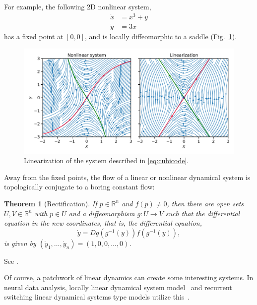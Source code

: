 \documentclass[a4paper,11pt]{exam}
\newtheorem{theorem}{Theorem}
\newcounter{ct}
\newcommand{\inv}{^{-1}}
\newcommand{\field}[1]{\ensuremath{\mathbb{#1}}}
\newcommand{\reals}{\field{R}}
\begin{document}
\begin{questions}
For example, the following 2D nonlinear system,
\begin{align}\label{eq:cubicode}
\dot x &= x^3 + y\\
\dot y &= 3x
\end{align}
has a fixed point at $[0, 0]$, and is locally diffeomorphic to a saddle (Fig.~\ref{fig:linearization}).
\begin{figure}[hbt]
    \centering
    \includegraphics[width=\textwidth]{linearization}
    \caption{Linearization of the system described in \eqref{eq:cubicode}.}
    \label{fig:linearization}
\end{figure}

Away from the fixed points, the flow of a linear or nonlinear dynamical system is topologically conjugate to a boring constant flow:
\begin{theorem}[Rectification]
    If $p \in \reals^n$ and $f(p) \neq 0$, then there are open sets $U, V \in \reals^n$ with $p \in U$ and a diffeomorphism $g: U \to V$ such that the differential equation in the new coordinates, that is, the differential equation,
    $$ \dot{y} = Dg(g\inv(y)) f(g\inv(y)), $$
is given by $(\dot{y}_1, \ldots, \dot{y}_n) = (1, 0, 0, \ldots, 0)$.
\end{theorem}
See \citet[Lemma 1.120]{Chicone2006}.

Of course, a patchwork of linear dynamics can create some interesting systems.
In neural data analysis, locally linear dynamical system model~\cite{Zhao2016d} and recurrent switching linear dynamical systems type models utilize this~\citep{Linderman2017,Nassar2018b}.


\end{questions}
\end{document}
